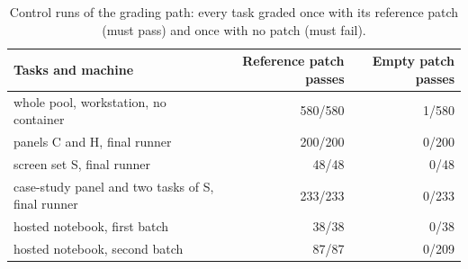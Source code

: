 \begin{table}[t]
\centering
\small
\caption{Control runs of the grading path: every task graded once with its reference patch (must pass) and once with no patch (must fail).}
\label{tab:controls}
\begin{tabular}{lrr}
\toprule
Tasks and machine & Reference patch passes & Empty patch passes \\
\midrule
whole pool, workstation, no container & 580/580 & 1/580 \\
panels C and H, final runner & 200/200 & 0/200 \\
screen set S, final runner & 48/48 & 0/48 \\
case-study panel and two tasks of S, final runner & 233/233 & 0/233 \\
hosted notebook, first batch & 38/38 & 0/38 \\
hosted notebook, second batch & 87/87 & 0/209 \\
\bottomrule
\end{tabular}
\end{table}
